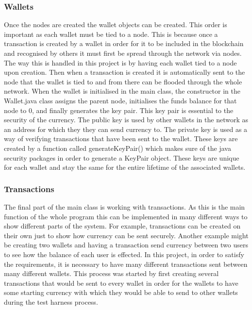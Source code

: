 \documentclass{l4proj}
\begin{document}
\subsubsection{Wallets}
Once the nodes are created the wallet objects can be created. This order is important as each wallet must be tied to
a node. This is because once a transaction is created by a wallet in order for it to be included in the blockchain
and recognised by others it must first be spread through the network via nodes. The way this is handled in this 
project is by having each wallet tied to a node upon creation. Then when a transaction is created it is automatically
sent to the node that the wallet is tied to and from there can be flooded through the whole network. When the wallet
is initialised in the main class, the constructor in the Wallet.java class assigns the parent node, initialises the
funds balance for that node to 0, and finally generates the key pair. This key pair is essential to the security 
of the currency. The public key is used by other wallets in the network as an address for which they they can send
currency to. The private key is used as a way of verifying transactions that have been sent to the wallet.
These keys are created by a function called generateKeyPair() which makes sure of the java security packages in order
to generate a KeyPair object. These keys are unique for each wallet and stay the same for the entire lifetime
of the associated wallets. 

\subsubsection{Transactions}
The final part of the main class is working with transactions. As this is the main function of the whole program
this can be implemented in many different ways to show different parts of the system. For example, transactions
can be created on their own just to show how currency can be sent securely. Another example might be creating two
wallets and having a transaction send currency between two users to see how the balance of each user is effected.
In this project, in order to satisfy the requirements, it is necessary to have many different transactions sent
between many different wallets. This process was started by first creating several transactions that would
be sent to every wallet in order for the wallets to have some starting currency with which they would be able to
send to other wallets during the test harness process. 
\end{document}
